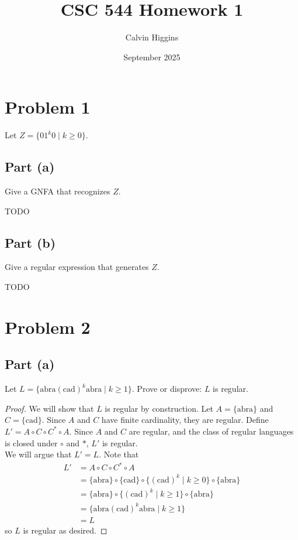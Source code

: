\documentclass{article}
\title{CSC 544 Homework 1}
\author{Calvin Higgins}
\date{September 2025}
\begin{document}
\maketitle

\section*{Problem 1}

Let $Z = \{ 0 1^k 0 \mid k \geq 0 \}$.

\subsection*{Part (a)}

Give a GNFA that recognizes $Z$.

TODO

\subsection*{Part (b)}

Give a regular expression that generates $Z$.

TODO

\section*{Problem 2}

\subsection*{Part (a)}

Let $L = \{ \text{abra}(\text{cad})^k\text{abra} \mid k \geq 1 \}$. Prove or disprove: $L$ is regular.

\begin{proof}
    We will show that $L$ is regular by construction. Let $A = \{ \text{abra} \}$ and $C = \{ \text{cad} \}$. Since $A$ and $C$ have finite cardinality, they 
    are regular. Define $L' = A \circ C \circ C^* \circ A$. Since $A$ and $C$ are regular, and the class of regular languages is closed under $\circ$ and $*$, 
    $L'$ is regular. \\
    
    \noindent
    We will argue that $L' = L$. Note that
    \begin{align*}
        L' &= A \circ C \circ C^* \circ A \\
        &= \{ \text{abra} \} \circ \{ \text{cad} \} \circ \{ (\text{cad})^k \mid k \geq 0 \} \circ \{ \text{abra} \} \\
        &= \{ \text{abra} \} \circ \{ (\text{cad})^k \mid k \geq 1 \} \circ \{ \text{abra} \} \\
        &=  \{ \text{abra} (\text{cad})^k \text{abra} \mid k \geq 1 \} \\
        &= L
    \end{align*} 
    so $L$ is regular as desired.
\end{proof}
\end{document}
